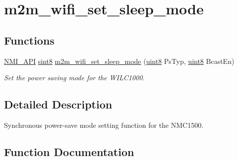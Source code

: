 \hypertarget{group__SetSleepModeFn}{}\section{m2m\+\_\+wifi\+\_\+set\+\_\+sleep\+\_\+mode}
\label{group__SetSleepModeFn}
\subsection*{Functions}
\begin{DoxyCompactItemize}
\item 
\hyperlink{group__BSPDefine_gaecc0323d771e41ef81a76b5f12783e22}{N\+M\+I\+\_\+\+A\+PI} \hyperlink{group__DataT_gae35f10ffd0ac8dd2bc3e794da9bdfbc7}{sint8} \hyperlink{group__SetSleepModeFn_gaeea00cc2149c37ac91e2cb5882dadd14}{m2m\+\_\+wifi\+\_\+set\+\_\+sleep\+\_\+mode} (\hyperlink{group__DataT_ga4df709a77647e870bbf1d955b8edc9a6}{uint8} Ps\+Typ, \hyperlink{group__DataT_ga4df709a77647e870bbf1d955b8edc9a6}{uint8} Bcast\+En)
\begin{DoxyCompactList}\small\item\em Set the power saving mode for the W\+I\+L\+C1000. \end{DoxyCompactList}\end{DoxyCompactItemize}


\subsection{Detailed Description}
Synchronous power-\/save mode setting function for the N\+M\+C1500. 

\subsection{Function Documentation}
\mbox{\label{group__SetSleepModeFn_gaeea00cc2149c37ac91e2cb5882dadd14}} 
